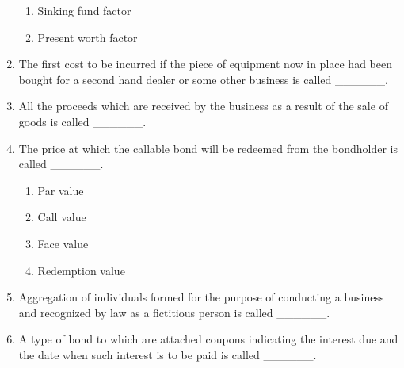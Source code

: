 \documentclass[11pt,a4paper]{article}
\begin{document}
\begin{enumerate}
\begin{enumerate}[label=\Alph*.]
\item{Sinking fund factor}
\item{Present worth factor}
\end{enumerate}
\item{The first cost to be incurred if the piece of equipment now in place had been bought for a second hand dealer or some other business is called \_\_\_\_\_\_.}
\\
\item{All the proceeds which are received by the business as a result of the sale of goods is called \_\_\_\_\_\_.}
\\
\item{The price at which the callable bond will be redeemed from the bondholder is called \_\_\_\_\_\_.}
\begin{enumerate}[label=\Alph*.]
\item{Par value}
\item{Call value}
\item{Face value}
\item{Redemption value}
\end{enumerate}
\item{Aggregation of individuals formed for the purpose of conducting a business and recognized by law as a fictitious person is called \_\_\_\_\_\_.}
\\
\item{A type of bond to which are attached coupons indicating the interest due and the date when such interest is to be paid is called \_\_\_\_\_\_.}

\end{enumerate}
\end{document}
